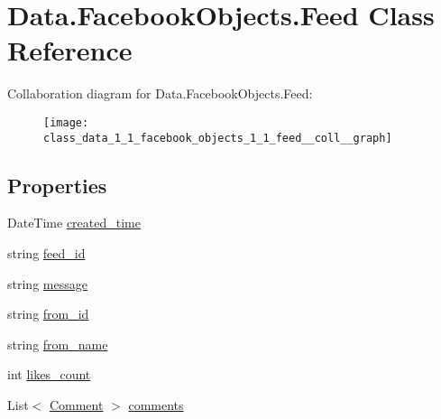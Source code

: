 \hypertarget{class_data_1_1_facebook_objects_1_1_feed}{}\section{Data.\+Facebook\+Objects.\+Feed Class Reference}
\label{class_data_1_1_facebook_objects_1_1_feed}


Collaboration diagram for Data.\+Facebook\+Objects.\+Feed\+:
\nopagebreak
\begin{figure}[H]
\begin{center}
\leavevmode
\texttt{[image: class\_data\_1\_1\_facebook\_objects\_1\_1\_feed\_\_coll\_\_graph]}
\end{center}
\end{figure}
\subsection*{Properties}
\begin{DoxyCompactItemize}
\item 
Date\+Time \hyperlink{class_data_1_1_facebook_objects_1_1_feed_afeb5ebd144f9b3990b8ff8d62e552ae2}{created\+\_\+time}
\item 
string \hyperlink{class_data_1_1_facebook_objects_1_1_feed_acfbbdb5bc789acd45a166c3efc8bcf48}{feed\+\_\+id}
\item 
string \hyperlink{class_data_1_1_facebook_objects_1_1_feed_a7f3204b98bbca6326617144ed65cd035}{message}
\item 
string \hyperlink{class_data_1_1_facebook_objects_1_1_feed_afff967ca34c531fc92fd09f359b375c5}{from\+\_\+id}
\item 
string \hyperlink{class_data_1_1_facebook_objects_1_1_feed_aa50149343a8931ea03ec99fd81f8100c}{from\+\_\+name}
\item 
int \hyperlink{class_data_1_1_facebook_objects_1_1_feed_aa3afa5771c16a58cc9083d85647dfb18}{likes\+\_\+count}
\item 
List$<$ \hyperlink{class_data_1_1_facebook_objects_1_1_comment}{Comment} $>$ \hyperlink{class_data_1_1_facebook_objects_1_1_feed_a4af15cfc976d908061796d4df72f1067}{comments}
\end{DoxyCompactItemize}


